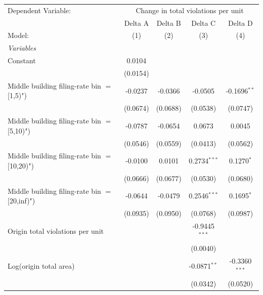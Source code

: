 \begingroup
\centering
\begin{tabular}{lcccc}
   \tabularnewline \midrule \midrule
   Dependent Variable: & \multicolumn{4}{c}{Change in total violations per unit}\\
                                                  & Delta A  & Delta B  & Delta C         & Delta D \\   
   Model:                                         & (1)      & (2)      & (3)             & (4)\\  
   \midrule
   \emph{Variables}\\
   Constant                                       & 0.0104   &          &                 &   \\   
                                                  & (0.0154) &          &                 &   \\   
   Middle building filing-rate bin $=$ [1,5)")    & -0.0237  & -0.0366  & -0.0505         & -0.1696$^{**}$\\   
                                                  & (0.0674) & (0.0688) & (0.0538)        & (0.0747)\\   
   Middle building filing-rate bin $=$ [5,10)")   & -0.0787  & -0.0654  & 0.0673          & 0.0045\\   
                                                  & (0.0546) & (0.0559) & (0.0413)        & (0.0562)\\   
   Middle building filing-rate bin $=$ [10,20)")  & -0.0100  & 0.0101   & 0.2734$^{***}$  & 0.1270$^{*}$\\   
                                                  & (0.0666) & (0.0677) & (0.0530)        & (0.0680)\\   
   Middle building filing-rate bin $=$ [20,inf)") & -0.0644  & -0.0479  & 0.2546$^{***}$  & 0.1695$^{*}$\\   
                                                  & (0.0935) & (0.0950) & (0.0768)        & (0.0987)\\   
   Origin total violations per unit               &          &          & -0.9445$^{***}$ &   \\   
                                                  &          &          & (0.0040)        &   \\   
   Log(origin total area)                         &          &          & -0.0871$^{**}$  & -0.3360$^{***}$\\   
                                                  &          &          & (0.0342)        & (0.0520)\\   

\end{tabular}
